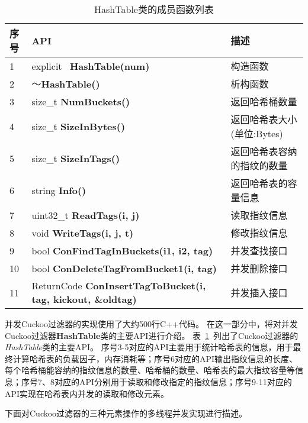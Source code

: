 \begin{table}[htbp]
  \caption{HashTable类的成员函数列表}
\label{tab:cbf_API}
\footnotesize
\centering
\begin{tabular}{lll}
\toprule
序号&API &   描述  \\
\midrule
1	&	explicit ~\textbf{HashTable(num)}									 	&  	构造函数\\
2	&	 ～\textbf{HashTable()}  									& 	析构函数\\
3	&	size\_t  \textbf{NumBuckets()} 									&  	返回哈希桶数量\\
4	&	size\_t  \textbf{SizeInBytes() }									&  	返回哈希表大小(单位:Bytes)\\
5	&	size\_t  \textbf{SizeInTags()} 									&  	返回哈希表容纳的指纹的数量\\
6	&	string   \textbf{Info()} 											&  	返回哈希表的容量信息\\
7	&	uint32\_t  \textbf{ReadTags(i, j)}										&  	读取指纹信息\\
8	&	void  \textbf{WriteTags(i, j, t)} 										&  	修改指纹信息\\
9	&	bool  \textbf{ ConFindTagInBuckets(i1, i2, tag) }			& 	并发查找接口\\
10	&	bool  \textbf{ ConDeleteTagFromBucket1(i, tag)	}			& 	并发删除接口\\
11	&	ReturnCode  \textbf{ ConInsertTagToBucket(i, tag, kickout, \&oldtag) }	& 并发插入接口\\
\bottomrule
\end{tabular}
\end{table}

并发Cuckoo过滤器的实现使用了大约500行C++代码。
在这一部分中，将对并发Cuckoo过滤器\textbf{HashTable}类的主要API进行介绍。
表~\ref{tab:cbf_API}~列出了Cuckoo过滤器的\textit{HashTable}类的主要API。
序号3-5对应的API主要用于统计哈希表的信息，用于最终计算哈希表的负载因子，内存消耗等；序号6对应的API输出指纹信息的长度、每个哈希桶能容纳的指纹信息的数量、哈希桶的数量、哈希表的最大指纹容量等信息；序号7、8对应的API分别用于读取和修改指定的指纹信息；序号9-11对应的API实现在哈希表内并发的读取和修改元素。

下面对Cuckoo过滤器的三种元素操作的多线程并发实现进行描述。

